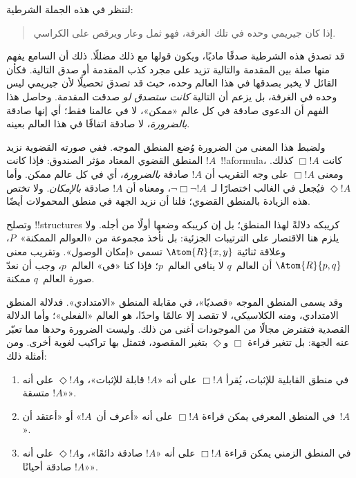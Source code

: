 \documentclass[../../../include/open-logic-section]{subfiles}
\begin{document}


لننظر في هذه الجملة الشرطية:
\begin{quote}
  إذا كان جيريمي وحده في تلك الغرفة، فهو ثمل وعار ويرقص على الكراسي.
\end{quote}
قد تصدق هذه الشرطية صدقًا ماديًا، ويكون قولها مع ذلك مضللًا.
ذلك أن السامع يفهم منها صلة بين المقدمة والتالية تزيد على مجرد
كذب المقدمة أو صدق التالية. فكأن القائل لا يخبر بصدقها في هذا
العالم وحده، حيث قد تصدق تحصيلًا لأن جيريمي ليس وحده في الغرفة،
بل يزعم أن التالية \emph{كانت ستصدق لو} صدقت المقدمة. وحاصل هذا
الفهم أن الدعوى صادقة في كل عالم «ممكن»، لا في عالمنا فقط؛ أي
إنها صادقة \emph{بالضرورة}، لا صادقة اتفاقًا في هذا العالم بعينه.

ولضبط هذا المعنى من الضرورة وُضع المنطق الموجه. ففي صورته القضوية
نزيد المنطق القضوي المعتاد مؤثر الصندوق: فإذا كانت $!A$~!!a{formula}،
كانت $\Box !A$ كذلك. ومعنى $\Box !A$ على وجه التقريب أن
$!A$ صادقة \emph{بالضرورة}، أي في كل عالم ممكن. وأما
$\Diamond !A$ فيُجعل في الغالب اختصارًا لـ~$\lnot \Box \lnot !A$،
ومعناه أن $!A$ صادقة \emph{بالإمكان}. ولا تختص هذه الزيادة
بالمنطق القضوي؛ فلنا أن نزيد الجهة في منطق المحمولات أيضًا.

وتصلح !!{structure}s كريبكه دلالةً لهذا المنطق؛ بل إن كريبكه
وضعها أولًا من أجله. ولا يلزم هنا الاقتصار على الترتيبات الجزئية:
بل نأخذ مجموعة من «العوالم الممكنة»~$P$، وعلاقة ثنائية
$\Atom{R}{x,y}$ تسمى «إمكان الوصول». وتقريب معنى $\Atom{R}{p,q}$
أن العالم~$q$ لا ينافي العالم~$p$؛ فإذا كنا «في» العالم~$p$،
وجب أن نعدّ صورة العالم~$q$ ممكنة.

وقد يسمى المنطق الموجه «قصديًا»، في مقابلة المنطق «الامتدادي».
فدلالة المنطق الامتدادي، ومنه الكلاسيكي، لا تقصد إلا عالمًا واحدًا،
هو العالم «الفعلي»؛ وأما الدلالة القصدية فتفترض مجالًا من
الموجودات أغنى من ذلك. وليست الضرورة وحدها مما تعبّر عنه الجهة:
بل تتغير قراءة $\Box$ و$\Diamond$ بتغير المقصود، فتمثل بها
تراكيب لغوية أخرى. ومن أمثلة ذلك:
\begin{enumerate}
\item في منطق القابلية للإثبات، يُقرأ $\Box !A$ على أنه «$!A$ قابلة
  للإثبات»، و$\Diamond !A$ على أنه «$!A$ متسقة».
\item في المنطق المعرفي يمكن قراءة $\Box !A$ على أنه «أعرف أن~$!A$»
  أو «أعتقد أن~$!A$».
\item في المنطق الزمني يمكن قراءة $\Box !A$ على أنه «$!A$ صادقة
  دائمًا»، و$\Diamond !A$ على أنه «$!A$ صادقة أحيانًا».
\end{enumerate}
\end{document}
